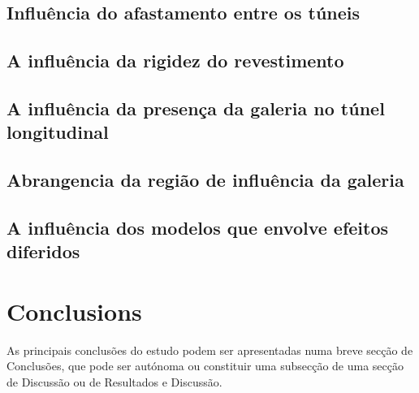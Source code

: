 \documentclass[a4paper,fleqn]{cas-sc}
\begin{document}
\subsection{Influência do afastamento entre os túneis}\label{}

\subsection{A influência da rigidez do revestimento}\label{}

\subsection{A influência da presença da galeria no túnel longitudinal}\label{}

\subsection{Abrangencia da região de influência da galeria}\label{}

\subsection{A influência dos modelos que envolve efeitos diferidos}\label{}

\section{Conclusions}\label{}

As principais conclusões do estudo podem ser apresentadas numa breve secção de Conclusões, que pode ser autónoma ou constituir uma subsecção de uma secção de Discussão ou de Resultados e Discussão.



\end{document}
